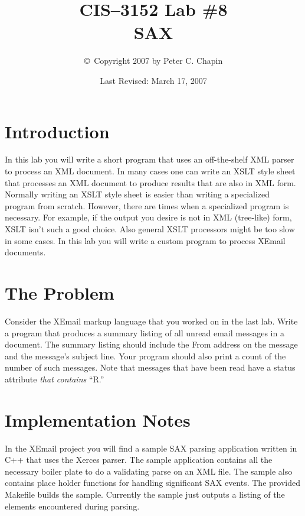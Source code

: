 \documentclass[twocolumn]{article}
\begin{document}
\title{CIS--3152 Lab \#8\\SAX}
\author{\copyright\ Copyright 2007 by Peter C. Chapin}
\date{Last Revised: March 17, 2007}
\maketitle

\section*{Introduction}

In this lab you will write a short program that uses an off-the-shelf XML parser to process an
XML document. In many cases one can write an XSLT style sheet that processes an XML document to
produce results that are also in XML form. Normally writing an XSLT style sheet is easier than
writing a specialized program from scratch. However, there are times when a specialized program
is necessary. For example, if the output you desire is not in XML (tree-like) form, XSLT isn't
such a good choice. Also general XSLT processors might be too slow in some cases. In this lab
you will write a custom program to process XEmail documents.

\section{The Problem}

Consider the XEmail markup language that you worked on in the last lab. Write a program that
produces a summary listing of all unread email messages in a document. The summary listing
should include the From address on the message and the message's subject line. Your program
should also print a count of the number of such messages. Note that messages that have been read
have a status attribute \emph{that contains} ``R.''

\section{Implementation Notes}

In the XEmail project you will find a sample SAX parsing application written in C++ that uses
the Xerces parser. The sample application contains all the necessary boiler plate to do a
validating parse on an XML file. The sample also contains place holder functions for handling
significant SAX events. The provided Makefile builds the sample. Currently the sample just
outputs a listing of the elements encountered during parsing.
\end{document}
